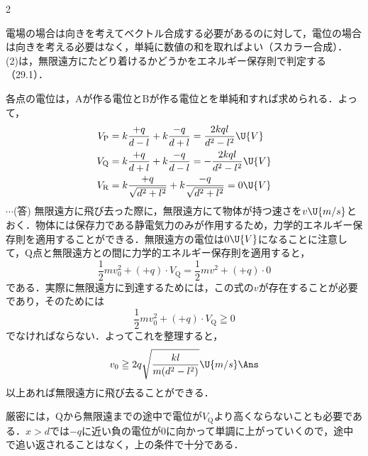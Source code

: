 \begin{multicols}{2}
\par\nopagebreak
\begin{sisin}
電場の場合は向きを考えてベクトル合成する必要があるのに対して，電位の場合は向きを考える必要はなく，単純に数値の和を取ればよい（スカラー合成）．
(2)は，無限遠方にたどり着けるかどうかをエネルギー保存則で判定する（29.1）．
\end{sisin}
\KaiHead
\begin{komon}
 各点の電位は，$\mathrm{A}$が作る電位と$\mathrm{B}$が作る電位とを単純和すれば求められる．よって，
       \[\begin{aligned}
         V_{\mathrm{P}}&=k\frac{+q}{d-l}+k\frac{-q}{d+l}=\frac{2kql}{d^2-l^2}\U{V}\\
         V_{\mathrm{Q}}&=k\frac{+q}{d+l}+k\frac{-q}{d-l}=-\frac{2kql}{d^2-l^2}\U{V}\\
         V_{\mathrm{R}}&=k\frac{+q}{\sqrt{d^2+l^2}}+k\frac{-q}{\sqrt{d^2+l^2}}=0\U{V}
       \end{aligned}\]
       \hspace*{\fill}$\cdots$(答)
 無限遠方に飛び去った際に，無限遠方にて物体が持つ速さを$v\U{m/s}$とおく．物体には保存力である静電気力のみが作用するため，力学的エネルギー保存則を適用することができる．無限遠方の電位は$0\U{V}$になることに注意して，$\mathrm{Q}$点と無限遠方との間に力学的エネルギー保存則を適用すると，
       \[\frac{1}{2}mv_0^2+(+q)\cdot V_{\mathrm{Q}}=\frac{1}{2}mv^2+(+q)\cdot 0\]
       である．実際に無限遠方に到達するためには，この式の$v$が存在することが必要であり，そのためには
       \[\frac{1}{2}mv_0^2+(+q)\cdot V_{\mathrm{Q}}\geqq 0\]
       でなければならない．よってこれを整理すると，
       \[v_0\geqq 2q\sqrt{\frac{kl}{m(d^2-l^2)}}\U{m/s}\Ans\]
       以上あれば無限遠方に飛び去ることができる．
       \begin{chuu}
       厳密には，$\mathrm{Q}$から無限遠までの途中で電位が$V_{\mathrm{Q}}$より高くならないことも必要である．$x>d$では$-q$に近い負の電位が$0$に向かって単調に上がっていくので，途中で追い返されることはなく，上の条件で十分である．
       \end{chuu}
\end{komon}


\end{multicols}
